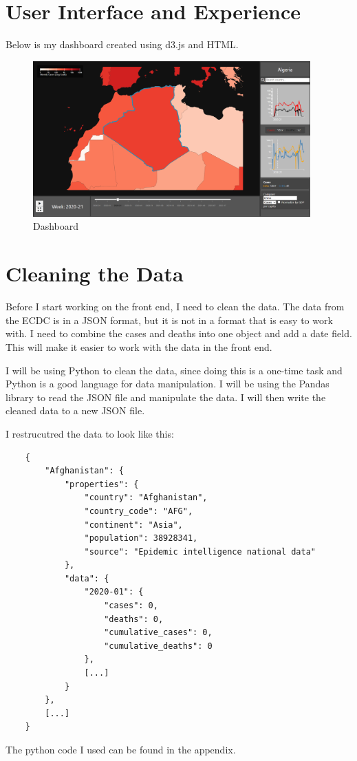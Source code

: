 \documentclass{report}
\begin{document}
\section{User Interface and Experience}
Below is my dashboard created using d3.js and HTML.
\begin{center}
    \begin{figure}[h]
        \centering
        \includegraphics[width=0.95\textwidth]{Images/dashboard.png}
        \caption{Dashboard}
        \label{fig:dashboard}
    \end{figure}
\end{center}

\newpage
\section{Cleaning the Data}
Before I start working on the front end, I need to clean the data. The data from the ECDC is in a JSON format, but it is not in a format that is easy to work with. I need to combine the cases and deaths into one object and add a date field. This will make it easier to work with the data in the front end.

I will be using Python to clean the data, since doing this is a one-time task and Python is a good language for data manipulation. I will be using the Pandas library to read the JSON file and manipulate the data. I will then write the cleaned data to a new JSON file.

I restrucutred the data to look like this:
\begin{center}
    \begin{lstlisting}
    {
        "Afghanistan": {
            "properties": {
                "country": "Afghanistan",
                "country_code": "AFG",
                "continent": "Asia",
                "population": 38928341,
                "source": "Epidemic intelligence national data"
            },
            "data": {
                "2020-01": {
                    "cases": 0,
                    "deaths": 0,
                    "cumulative_cases": 0,
                    "cumulative_deaths": 0
                },
                [...]
            }
        },
        [...]
    }
    \end{lstlisting}
\end{center}
The python code I used can be found in the appendix.
\end{document}
